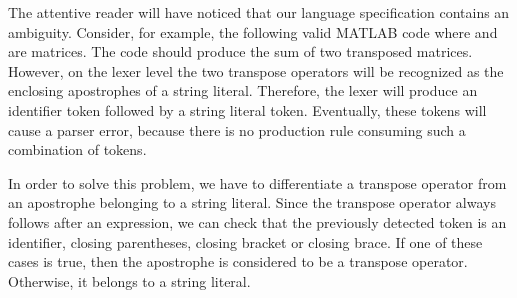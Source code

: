 The attentive reader will have noticed that our language specification contains an ambiguity.
Consider, for example, the following valid MATLAB code  where  and  are matrices.
The code should produce the sum of two transposed matrices.
However, on the lexer level the two transpose operators will be recognized as the enclosing apostrophes of a string literal.
Therefore, the lexer will produce an identifier token followed by a string literal token.
Eventually, these tokens will cause a parser error, because there is no production rule consuming such a combination of tokens.

In order to solve this problem, we have to differentiate a transpose operator from an apostrophe belonging to a string literal.
Since the transpose operator always follows after an expression, we can check that the previously detected token is an identifier, closing parentheses, closing bracket or closing brace.
If one of these cases is true, then the apostrophe is considered to be a transpose operator.
Otherwise, it belongs to a string literal.